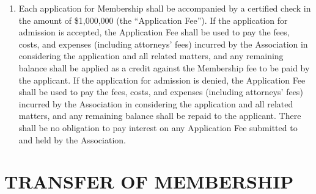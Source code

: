 \documentclass[]{book}
\begin{document}
\begin{enumerate}
\item
  Each application for Membership shall be accompanied by a certified check in the amount of \$1,000,000 (the ``Application Fee''). If the application for admission is accepted, the Application Fee shall be used to pay the fees, costs, and expenses (including attorneys' fees) incurred by the Association in considering the application and all related matters, and any remaining balance shall be applied as a credit against the Membership fee to be paid by the applicant. If the application for admission is denied, the Application Fee shall be used to pay the fees, costs, and expenses (including attorneys' fees) incurred by the Association in considering the application and all related matters, and any remaining balance shall be repaid to the applicant. There shall be no obligation to pay interest on any Application Fee submitted to and held by the Association.
\end{enumerate}

\hypertarget{transfer-of-membership}{%
\section{TRANSFER OF MEMBERSHIP}\label{transfer-of-membership}}
\end{document}

